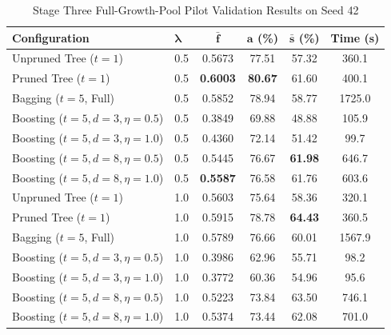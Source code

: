 \begin{table}[!h]
\centering
\caption{Stage Three Full-Growth-Pool Pilot Validation Results on Seed 42}
\label{tab:pilot_results}
\scriptsize
\setlength{\tabcolsep}{1.8pt}
\begin{tabular}{llcccc}
\toprule
\textbf{Configuration} & $\boldsymbol{\lambda}$ & $\boldsymbol{\bar{f}}$ & $\boldsymbol{a}$ \textbf{(\%)} & $\boldsymbol{\bar{s}}$ \textbf{(\%)} & \textbf{Time (s)} \\
\midrule
Unpruned Tree ($t=1$)          & 0.5 & 0.5673 & 77.51 & 57.32 &  360.1 \\
Pruned Tree ($t=1$)            & 0.5 & \textbf{0.6003} & \textbf{80.67} & 61.60 &  400.1 \\
Bagging ($t=5$, Full)          & 0.5 & 0.5852 & 78.94 & 58.77 & 1725.0 \\
Boosting ($t=5, d=3, \eta=0.5$)& 0.5 & 0.3849 & 69.88 & 48.88 &  105.9 \\
Boosting ($t=5, d=3, \eta=1.0$)& 0.5 & 0.4360 & 72.14 & 51.42 &   99.7 \\
Boosting ($t=5, d=8, \eta=0.5$)& 0.5 & 0.5445 & 76.67 & \textbf{61.98} &  646.7 \\
Boosting ($t=5, d=8, \eta=1.0$)& 0.5 & \textbf{0.5587} & 76.58 & 61.76 &  603.6 \\
\midrule
Unpruned Tree ($t=1$)          & 1.0 & 0.5603 & 75.64 & 58.36 &  320.1 \\
Pruned Tree ($t=1$)            & 1.0 & 0.5915 & 78.78 & \textbf{64.43} &  360.5 \\
Bagging ($t=5$, Full)          & 1.0 & 0.5789 & 76.66 & 60.01 & 1567.9 \\
Boosting ($t=5, d=3, \eta=0.5$)& 1.0 & 0.3986 & 62.96 & 55.71 &   98.2 \\
Boosting ($t=5, d=3, \eta=1.0$)& 1.0 & 0.3772 & 60.36 & 54.96 &   95.6 \\
Boosting ($t=5, d=8, \eta=0.5$)& 1.0 & 0.5223 & 73.84 & 63.50 &  746.1 \\
Boosting ($t=5, d=8, \eta=1.0$)& 1.0 & 0.5374 & 73.44 & 62.08 &  701.0 \\
\bottomrule
\end{tabular}
\end{table}

